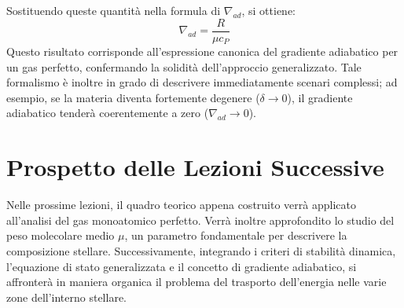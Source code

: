 Sostituendo queste quantità nella formula di $\nabla_{ad}$, si ottiene:
\begin{equation}
\nabla_{ad} = \frac{R}{\mu c_P}
\end{equation}
Questo risultato corrisponde all'espressione canonica del gradiente adiabatico per un gas perfetto, confermando la solidità dell'approccio generalizzato. Tale formalismo è inoltre in grado di descrivere immediatamente scenari complessi; ad esempio, se la materia diventa fortemente degenere ($\delta \to 0$), il gradiente adiabatico tenderà coerentemente a zero ($\nabla_{ad} \to 0$).

\section*{Prospetto delle Lezioni Successive}
Nelle prossime lezioni, il quadro teorico appena costruito verrà applicato all'analisi del gas monoatomico perfetto. Verrà inoltre approfondito lo studio del peso molecolare medio $\mu$, un parametro fondamentale per descrivere la composizione stellare. Successivamente, integrando i criteri di stabilità dinamica, l'equazione di stato generalizzata e il concetto di gradiente adiabatico, si affronterà in maniera organica il problema del trasporto dell'energia nelle varie zone dell'interno stellare.